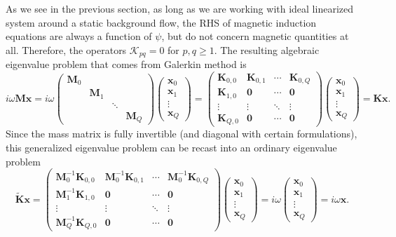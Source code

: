 As we see in the previous section, as long as we are working with ideal linearized system around a static background flow, the RHS of magnetic induction equations are always a function of $\psi$, but do not concern magnetic quantities at all. Therefore, the operators $\mathcal{K}_{pq} = 0$ for $p,q\geq 1$. The resulting algebraic eigenvalue problem that comes from Galerkin method is
\[
    i\omega \mathbf{M} \mathbf{x} =
    i\omega \begin{pmatrix}
        \mathbf{M}_0 & & & \\
        & \mathbf{M}_1 & & \\
        & & \ddots & \\
        & & & \mathbf{M}_{Q}
    \end{pmatrix} 
    \begin{pmatrix}
        \mathbf{x}_0 \\ \mathbf{x}_1 \\ \vdots \\ \mathbf{x}_{Q}
    \end{pmatrix} = 
    \begin{pmatrix}
        \mathbf{K}_{0,0} & \mathbf{K}_{0,1} & \cdots & \mathbf{K}_{0,Q} \\ 
        \mathbf{K}_{1,0} & \mathbf{0} & \cdots & \mathbf{0} \\ 
        \vdots & \vdots & \ddots & \vdots \\
        \mathbf{K}_{Q,0} & \mathbf{0} & \cdots & \mathbf{0}
    \end{pmatrix}
    \begin{pmatrix}
        \mathbf{x}_0 \\ \mathbf{x}_1 \\ \vdots \\ \mathbf{x}_{Q}
    \end{pmatrix} = \mathbf{K} \mathbf{x}.
\]
Since the mass matrix is fully invertible (and diagonal with certain formulations), this generalized eigenvalue problem can be recast into an ordinary eigenvalue problem
\[
    \widetilde{\mathbf{K}} \mathbf{x} = 
    \begin{pmatrix}
        \mathbf{M}_0^{-1}\mathbf{K}_{0,0} & \mathbf{M}_0^{-1}\mathbf{K}_{0,1} & \cdots & \mathbf{M}_0^{-1}\mathbf{K}_{0,Q} \\ 
        \mathbf{M}_1^{-1}\mathbf{K}_{1,0} & \mathbf{0} & \cdots & \mathbf{0} \\ 
        \vdots & \vdots & \ddots & \vdots \\
        \mathbf{M}_Q^{-1} \mathbf{K}_{Q,0} & \mathbf{0} & \cdots & \mathbf{0}
    \end{pmatrix}
    \begin{pmatrix}
        \mathbf{x}_0 \\ \mathbf{x}_1 \\ \vdots \\ \mathbf{x}_{Q}
    \end{pmatrix} = i\omega 
    \begin{pmatrix}
        \mathbf{x}_0 \\ \mathbf{x}_1 \\ \vdots \\ \mathbf{x}_{Q}
    \end{pmatrix} = i\omega \mathbf{x}.
\]

